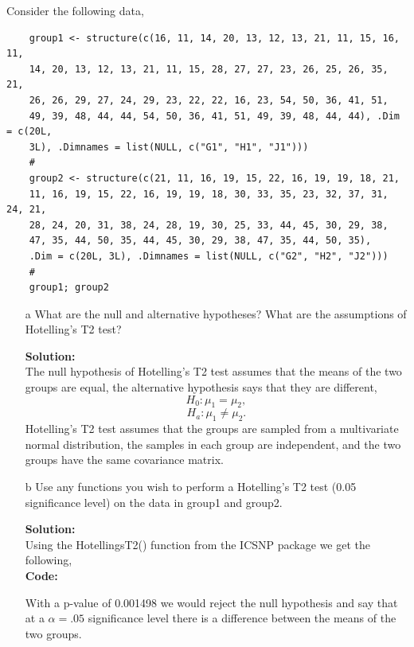 \documentclass[12pt]{article}
\makeatletter
\theoremstyle{homework}
\newenvironment{exercise}[1]
{\def\@currentlabel{#1}\exercisecore}
{\endexercisecore}
\newcommand{\localhead}[1]{\par\smallskip\noindent\textbf{#1}\nobreak\\}%
\newcommand\solution{\localhead{Solution:}}
\makeatother
\begin{document}
\begin{exercise}{1} Consider the following data, 
  \begin{footnotesize}
  \begin{verbatim}
    group1 <- structure(c(16, 11, 14, 20, 13, 12, 13, 21, 11, 15, 16, 11,
    14, 20, 13, 12, 13, 21, 11, 15, 28, 27, 27, 23, 26, 25, 26, 35, 21, 
    26, 26, 29, 27, 24, 29, 23, 22, 22, 16, 23, 54, 50, 36, 41, 51, 
    49, 39, 48, 44, 44, 54, 50, 36, 41, 51, 49, 39, 48, 44, 44), .Dim = c(20L, 
    3L), .Dimnames = list(NULL, c("G1", "H1", "J1")))
    #
    group2 <- structure(c(21, 11, 16, 19, 15, 22, 16, 19, 19, 18, 21,
    11, 16, 19, 15, 22, 16, 19, 19, 18, 30, 33, 35, 23, 32, 37, 31, 24, 21, 
    28, 24, 20, 31, 38, 24, 28, 19, 30, 25, 33, 44, 45, 30, 29, 38, 
    47, 35, 44, 50, 35, 44, 45, 30, 29, 38, 47, 35, 44, 50, 35), 
    .Dim = c(20L, 3L), .Dimnames = list(NULL, c("G2", "H2", "J2")))
    #
    group1; group2
  \end{verbatim}
  \end{footnotesize}

  \begin{enumerate}
    \item[a] What are the null and alternative hypotheses?  What are the assumptions of Hotelling's T2 test?\\
    \solution  The null hypothesis of Hotelling's T2 test assumes that the means of the two groups are equal, the alternative 
    hypothesis says that they are different,
    \begin{equation*}
      H_0: \mu_1 = \mu_2,
    \end{equation*}
    \begin{equation*}
      H_a: \mu_1 \neq \mu_2.
    \end{equation*}
    Hotelling's T2 test assumes that the groups are sampled from a multivariate normal distribution, the samples in each group are independent, and the two groups have 
    the same covariance matrix.  
    \vspace{.15in}

    \item[b] Use any functions you wish to perform a Hotelling's T2 test (0.05 significance level) on the data in group1 and group2.\\
    \solution Using the HotellingsT2() function from the ICSNP package we get the following,\\
    \textbf{Code:}
      \begin{center}
      
      \end{center}
    With a p-value of 0.001498 we would reject the null hypothesis and say that at a $\alpha = .05$ significance level there is a difference between the 
    means of the two groups. 
    \vspace{.15in}




\end{enumerate}
\end{exercise}
\end{document}
